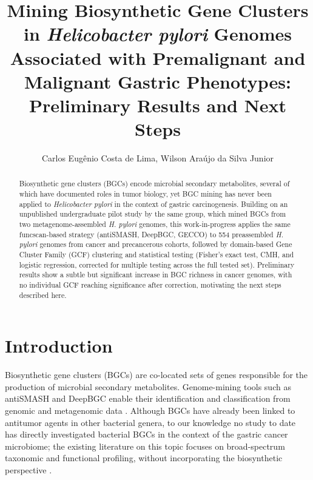 \documentclass[12pt]{article}
\title{Mining Biosynthetic Gene Clusters in \textit{Helicobacter pylori} Genomes Associated with Premalignant and Malignant Gastric Phenotypes: Preliminary Results and Next Steps}
\author{Carlos Eugênio Costa de Lima, Wilson Araújo da Silva Junior}
\begin{document}
\maketitle

\begin{abstract}
Biosynthetic gene clusters (BGCs) encode microbial secondary metabolites, several of which have documented roles in tumor biology, yet BGC mining has never been applied to \textit{Helicobacter pylori} in the context of gastric carcinogenesis. Building on an unpublished undergraduate pilot study by the same group, which mined BGCs from two metagenome-assembled \textit{H. pylori} genomes, this work-in-progress applies the same funcscan-based strategy (antiSMASH, DeepBGC, GECCO) to 554 preassembled \textit{H. pylori} genomes from cancer and precancerous cohorts, followed by domain-based Gene Cluster Family (GCF) clustering and statistical testing (Fisher's exact test, CMH, and logistic regression, corrected for multiple testing across the full tested set). Preliminary results show a subtle but significant increase in BGC richness in cancer genomes, with no individual GCF reaching significance after correction, motivating the next steps described here.
\end{abstract}

\section{Introduction}

Biosynthetic gene clusters (BGCs) are co-located sets of genes responsible for the production of microbial secondary metabolites. Genome-mining tools such as antiSMASH and DeepBGC enable their identification and classification from genomic and metagenomic data \cite{blin2025,hannigan2019}. Although BGCs have already been linked to antitumor agents in other bacterial genera, to our knowledge no study to date has directly investigated bacterial BGCs in the context of the gastric cancer microbiome; the existing literature on this topic focuses on broad-spectrum taxonomic and functional profiling, without incorporating the biosynthetic perspective \cite{coker2018,noto2017}.
\end{document}
